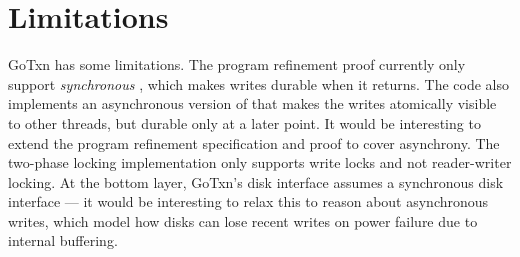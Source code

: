





\section{Limitations}
\label{sec:txn:limitations}

GoTxn has some limitations. The program refinement proof currently only support
\emph{synchronous} , which makes writes durable when it returns. The
code also implements an asynchronous version of  that makes the
writes atomically visible to other threads, but durable only at a later point.
It would be interesting to extend the program refinement specification and proof
to cover asynchrony. The two-phase locking implementation only supports write
locks and not reader-writer locking. At the bottom layer, GoTxn's disk interface
assumes a synchronous disk interface --- it would be interesting to relax this
to reason about asynchronous writes, which model how disks can lose recent
writes on power failure due to internal buffering.



